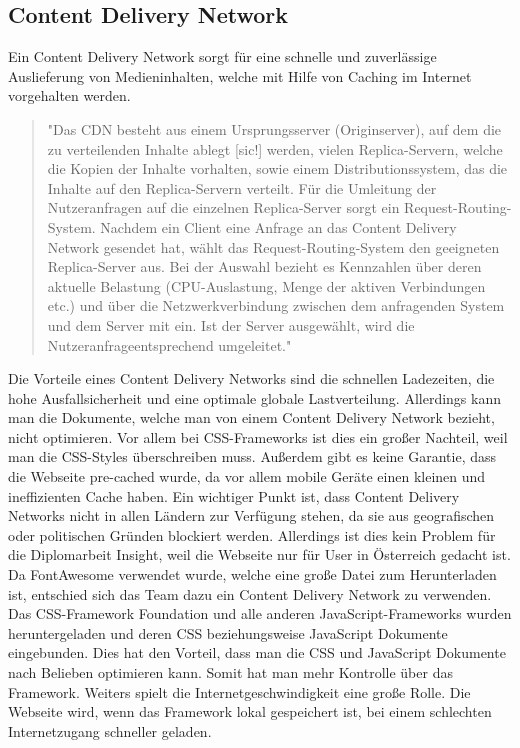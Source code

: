 \subsection{Content Delivery Network}
Ein Content Delivery Network sorgt für eine schnelle und zuverlässige Auslieferung von Medieninhalten, welche mit Hilfe von Caching im Internet vorgehalten werden. \cite{cdn}

\begin{quote}
"Das CDN besteht aus einem Ursprungsserver (Originserver), auf dem die zu verteilenden Inhalte ablegt [sic!] werden, vielen Replica-Servern, welche die Kopien der Inhalte vorhalten, sowie einem Distributionssystem, das die Inhalte auf den Replica-Servern verteilt. Für die Umleitung der Nutzeranfragen auf die einzelnen Replica-Server sorgt ein Request-Routing-System. Nachdem ein Client eine Anfrage an das Content Delivery Network gesendet hat, wählt das Request-Routing-System den geeigneten Replica-Server aus. Bei der Auswahl bezieht es Kennzahlen über deren aktuelle Belastung (CPU-Auslastung, Menge der aktiven Verbindungen etc.) und über die Netzwerkverbindung zwischen dem anfragenden System und dem Server mit ein. Ist der Server ausgewählt, wird die Nutzeranfrageentsprechend umgeleitet." \cite{zitatcdn}
\end{quote}
Die Vorteile eines Content Delivery Networks sind die schnellen Ladezeiten, die hohe Ausfallsicherheit und eine optimale globale Lastverteilung. Allerdings kann man die Dokumente, welche man von einem Content Delivery Network bezieht, nicht optimieren. Vor allem bei CSS-Frameworks ist dies ein großer Nachteil, weil man die CSS-Styles überschreiben muss. Außerdem gibt es keine Garantie, dass die Webseite pre-cached wurde, da vor allem mobile Geräte einen kleinen und ineffizienten Cache haben. Ein wichtiger Punkt ist, dass Content Delivery Networks nicht in allen Ländern zur Verfügung stehen, da sie aus geografischen oder politischen Gründen blockiert werden. Allerdings ist dies kein Problem für die Diplomarbeit Insight, weil die Webseite nur für User in Österreich gedacht ist. \cite{cdnnachteile}
\leavevmode \\
Da FontAwesome verwendet wurde, welche eine große Datei zum Herunterladen ist, entschied sich das Team dazu ein Content Delivery Network zu verwenden. Das CSS-Framework Foundation und alle anderen JavaScript-Frameworks wurden heruntergeladen und deren CSS beziehungsweise JavaScript Dokumente eingebunden. Dies hat den Vorteil, dass man die CSS und JavaScript Dokumente nach Belieben optimieren kann. Somit hat man mehr Kontrolle über das Framework. Weiters spielt die Internetgeschwindigkeit eine große Rolle. Die Webseite wird, wenn das Framework lokal gespeichert ist, bei einem schlechten Internetzugang schneller geladen.
